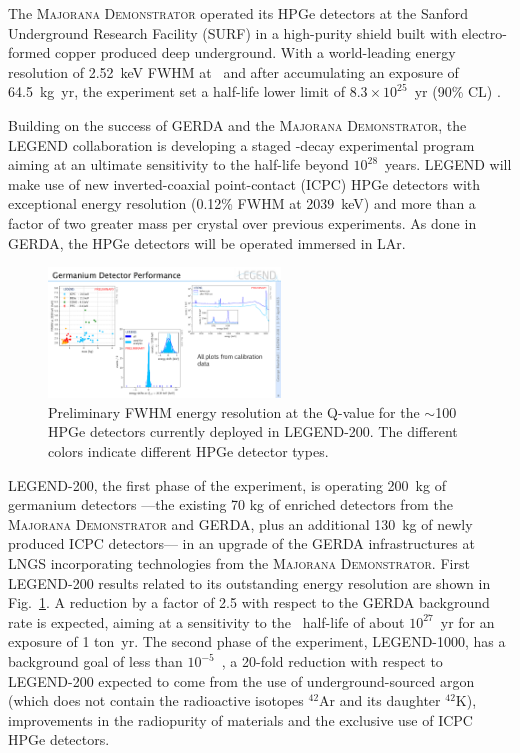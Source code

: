 The \textsc{Majorana Demonstrator} operated its HPGe detectors at the Sanford Underground Research Facility (SURF) in a high-purity shield built with electro-formed copper produced deep underground. With a world-leading energy resolution of 2.52~keV FWHM at \Qbb\ and after accumulating an exposure of 64.5~kg~yr, the experiment set a half-life lower limit of $8.3\times10^{25}$~yr (90\% CL) \cite{Majorana:2022udl}.

Building on the success of GERDA and the \textsc{Majorana Demonstrator}, the LEGEND \cite{LEGEND:2021bnm} collaboration is developing a staged \bbonu-decay experimental program aiming at an ultimate sensitivity to the  half-life beyond $10^{28}$~years. 
LEGEND will make use of new inverted-coaxial point-contact (ICPC) HPGe detectors with exceptional energy resolution (0.12\% FWHM at 2039~keV) and more than a factor of two greater mass per crystal over previous experiments. As done in GERDA, the HPGe detectors will be operated immersed in LAr.

\begin{figure}[t!b!]
\begin{center}
\includegraphics[width=0.55\textwidth]{img/legend-200.pdf}
\end{center}
\caption{Preliminary FWHM energy resolution at the  Q-value for the $\sim$100 HPGe detectors currently deployed in LEGEND-200. The different colors indicate different HPGe detector types.}  \label{fig:legend-200}
\end{figure}

LEGEND-200, the first phase of the experiment, is operating 200~kg of germanium detectors ---\thinspace the existing 70 kg of enriched detectors from the \textsc{Majorana Demonstrator} and GERDA, plus an additional 130~kg of newly produced ICPC detectors\thinspace--- in an upgrade of the GERDA infrastructures at LNGS incorporating technologies from the \textsc{Majorana Demonstrator}. First LEGEND-200 results related to its outstanding energy resolution are shown in Fig.~\ref{fig:legend-200}. A reduction by a factor of 2.5 with respect to the GERDA background rate is expected, aiming at a sensitivity to the \bbonu\ half-life of about $10^{27}$~yr for  an exposure of 1 ton~yr. The second phase of the experiment, LEGEND-1000, has a background goal of less than $10^{-5}$~\ckky, a 20-fold reduction with respect to LEGEND-200 expected to come from the use of underground-sourced argon (which does not contain the radioactive isotopes $^{42}$Ar and its daughter $^{42}$K), improvements in the radiopurity of materials and the exclusive use of ICPC HPGe detectors.
